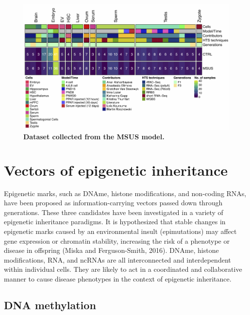\documentclass[12pt,twoside]{reedthesis}
\begin{document}
\begin{figure}[H]

{\centering \includegraphics{thesis_files/figure-latex/if5-1} 

}

\caption[Dataset collected from the MSUS model]{\textbf{Dataset collected from the MSUS model.}}\label{fig:if5}
\end{figure}
\hypertarget{vectors-of-epigenetic-inheritance}{%
\section*{Vectors of epigenetic inheritance}\label{vectors-of-epigenetic-inheritance}}

Epigenetic marks, such as DNAme, histone modifications, and non-coding
RNAs, have been proposed as information-carrying vectors passed down
through generations. These three candidates have been investigated in a
variety of epigenetic inheritance paradigms. It is hypothesized that stable changes in
epigenetic marks caused by an environmental insult (epimutations) may
affect gene expression or chromatin stability, increasing the risk of a
phenotype or disease in offspring (Miska and Ferguson-Smith, 2016).
DNAme, histone modifications, RNA, and ncRNAs are all interconnected and
interdependent within individual cells. They are likely to act in a
coordinated and collaborative manner to cause disease phenotypes in the
context of epigenetic inheritance.

\hypertarget{dna-methylation}{%
\subsection*{DNA methylation}\label{dna-methylation}}
\end{document}

